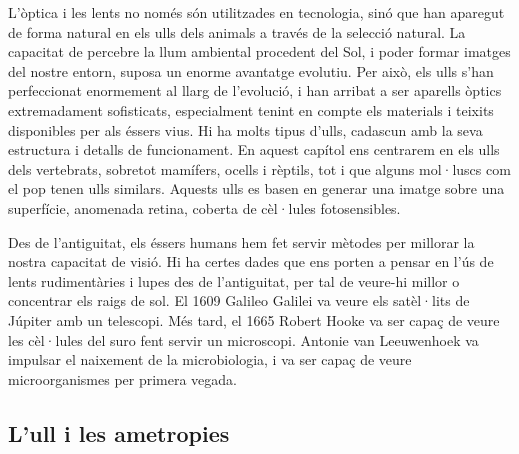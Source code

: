 \documentclass[12pt]{book}
\begin{document}
L'òptica i les lents no només són utilitzades en tecnologia, sinó que han aparegut de forma natural en els ulls dels animals a través de la selecció natural. La capacitat de percebre la llum ambiental procedent del Sol, i poder formar imatges del nostre entorn, suposa un enorme avantatge evolutiu. Per això, els ulls s'han perfeccionat enormement al llarg de l'evolució, i han arribat a ser aparells òptics extremadament sofisticats, especialment tenint en compte els materials i teixits disponibles per als éssers vius. Hi ha molts tipus d'ulls, cadascun amb la seva estructura i detalls de funcionament. En aquest capítol ens centrarem en els ulls dels vertebrats, sobretot mamífers, ocells i rèptils, tot i que alguns mol·luscs com el pop tenen ulls similars. Aquests ulls es basen en generar una imatge sobre una superfície, anomenada retina, coberta de cèl·lules fotosensibles.

Des de l'antiguitat, els éssers humans hem fet servir mètodes per millorar la nostra capacitat de visió. Hi ha certes dades que ens porten a pensar en l'ús de lents rudimentàries i lupes des de l'antiguitat, per tal de veure-hi millor o concentrar els raigs de sol. El 1609 Galileo Galilei va veure els satèl·lits de Júpiter amb un telescopi. Més tard, el 1665 Robert Hooke va ser capaç de veure les cèl·lules del suro fent servir un microscopi. Antonie van Leeuwenhoek va impulsar el naixement de la microbiologia, i va ser capaç de veure microorganismes per primera vegada. 

\subsection{L'ull i les ametropies}
\end{document}
